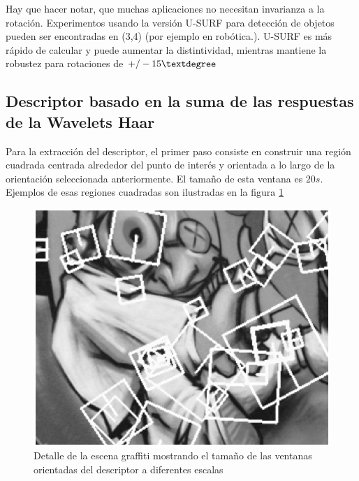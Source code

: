 Hay que hacer notar, que muchas aplicaciones no necesitan invarianza a la rotación. Experimentos usando la versión U-SURF para detección de objetos pueden ser encontradas en (3,4) (por ejemplo en robótica.). U-SURF es más rápido de calcular y puede aumentar la distintividad, mientras mantiene la robustez para rotaciones de $+/- 15\text{\ensuremath{\textdegree}}$

\subsection{Descriptor basado en la suma de las respuestas de la Wavelets Haar}
Para la extracción del descriptor, el primer paso consiste en construir una región cuadrada centrada alrededor del punto de interés y orientada a lo largo de la orientación seleccionada anteriormente. El tamaño de esta ventana es $20s$. Ejemplos de esas regiones cuadradas son ilustradas en la figura \ref{fig:squareregionsexample}

\begin{figure}[tbhp]
   \centering
        \includegraphics[scale=0.4]{./figs/squareregionsexample}
    \caption[]{Detalle de la escena graffiti mostrando el tamaño de las ventanas orientadas del descriptor a diferentes escalas}
   \label{fig:squareregionsexample}                %
\end{figure}

